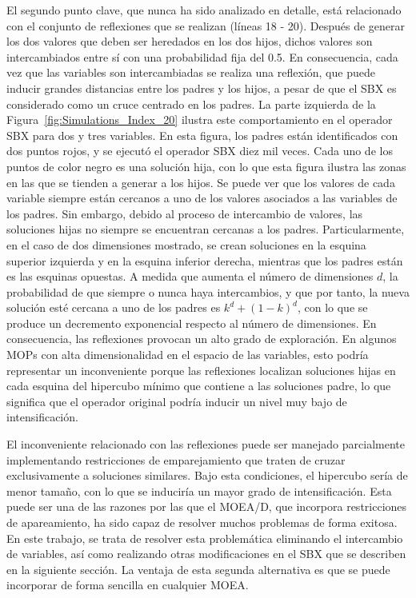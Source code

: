 El segundo punto clave, que nunca ha sido analizado en detalle, está relacionado con el conjunto de reflexiones que se realizan (líneas 18 - 20).
%
%
Después de generar los dos valores que deben ser heredados en los dos hijos, dichos valores son intercambiados entre sí con una probabilidad fija del 0.5.
%
En consecuencia, cada vez que las variables son intercambiadas se realiza una reflexión, que puede inducir grandes distancias entre los padres y los hijos, a pesar de que el SBX es considerado como un cruce centrado en los padres.
%
La parte izquierda de  la Figura~\ref{fig:Simulations_Index_20} ilustra  este comportamiento en el operador SBX para dos y tres variables.
%
En esta figura, los padres están identificados con dos puntos rojos, y se ejecutó el operador SBX diez mil veces.
%
Cada uno de los puntos de color negro es una solución hija, con lo que esta figura ilustra las zonas en las que se tienden a generar a los hijos.
%
Se puede ver que los valores de cada variable siempre están cercanos a uno de los valores asociados a las variables de los padres. 
%
Sin embargo, debido al proceso de intercambio de valores, las soluciones hijas no siempre se encuentran cercanas a los padres.
%
Particularmente, en el caso de dos dimensiones mostrado, se crean soluciones en la esquina superior izquierda y en la esquina inferior derecha, mientras que los padres están es las esquinas opuestas.
%
A medida que aumenta el número de dimensiones $d$, la probabilidad de que siempre o nunca haya intercambios, y que por tanto, la nueva solución esté cercana a uno de los padres es $k^{d} + (1-k)^{d}$, con lo que se produce un decremento exponencial respecto al número de dimensiones.
%
%
En consecuencia, las reflexiones provocan un alto grado de exploración.
En algunos MOPs con alta dimensionalidad en el espacio de las variables, esto podría representar un inconveniente porque las reflexiones localizan soluciones hijas en cada esquina del hipercubo mínimo que contiene a las soluciones padre, lo que significa que el operador original podría inducir un nivel muy bajo de intensificación.

El inconveniente relacionado con las reflexiones puede ser manejado parcialmente implementando restricciones de emparejamiento que traten de cruzar exclusivamente a soluciones similares. 
%
Bajo esta condiciones, el hipercubo sería de menor tamaño, con lo que se induciría un mayor grado de intensificación.
%
Esta puede ser una de las razones por las que el MOEA/D, que incorpora restricciones de apareamiento, ha sido capaz de resolver muchos problemas de forma exitosa.
%
En este trabajo, se trata de resolver esta problemática eliminando el intercambio de variables, así como realizando otras modificaciones en el SBX que se describen en la siguiente sección.
%
La ventaja de esta segunda alternativa es que se puede incorporar de forma sencilla en cualquier MOEA.
%

